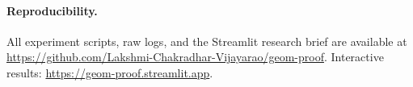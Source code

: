 \documentclass[10pt,twocolumn]{article}
\begin{document}
\paragraph{Reproducibility.}
All experiment scripts, raw logs, and the Streamlit research brief
are available at
\url{https://github.com/Lakshmi-Chakradhar-Vijayarao/geom-proof}.
Interactive results: \url{https://geom-proof.streamlit.app}.



\end{document}
